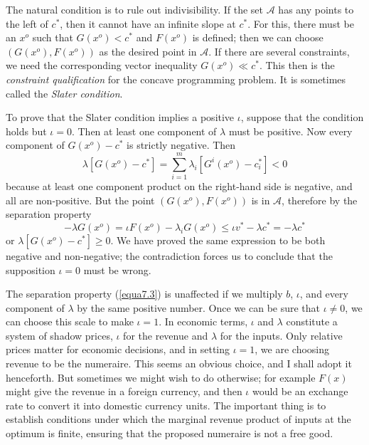 The natural condition is to rule out indivisibility. If the set $\mathcal{A}$ has any points to the left of $c^*$, then it cannot have an infinite slope at $c^*$. For this, there must be an $x^o$ such that $G(x^o) < c^*$ and $F(x^o)$ is defined; then we can choose $(G(x^o), F(x^o))$ as the desired point in $\mathcal{A}$. If there are several constraints, we need the corresponding vector inequality $G(x^o) \ll c^*$. This then is the \textit{constraint qualification} for the concave programming problem. It is sometimes called the \textit{Slater condition}.

To prove that the Slater condition implies a positive $\iota$, suppose that the condition holds but $\iota=0$. Then at least one component of $\lambda$ must be positive. Now every component of $G(x^o) - c^*$ is strictly negative. Then
\begin{equation*}
\lambda [G(x^o) - c^*] = \sum\limits_{i=1}^m \lambda_i [G^i(x^o) - c_i^*] < 0
\end{equation*}
because at least one component product on the right-hand side is negative, and all are non-positive. But the point $(G(x^o), F(x^o))$ is in $\mathcal{A}$, therefore by the separation property
\begin{equation*}
- \lambda G(x^o)  =  \iota F(x^o) - \lambda_i G(x^o) \leq \iota v^* - \lambda c^* =  - \lambda c^*
\end{equation*}
or $\lambda [G(x^o) - c^*] \geq 0$. We have proved the same expression to be both negative and non-negative; the contradiction forces us to conclude that the supposition $\iota=0$ must be wrong.

The separation property (\ref{equa7.3}) is unaffected if we multiply $b$, $\iota$, and every component of $\lambda$ by the same positive number. Once we can be sure that $\iota \neq 0$, we can choose this scale to make $\iota = 1$. In economic terms, $\iota$ and $\lambda$ constitute a system of shadow prices, $\iota$ for the revenue and $\lambda$ for the inputs. Only relative prices matter for economic decisions, and in setting $\iota =1$, we are choosing revenue to be the numeraire. This seems an obvious choice, and I shall adopt it henceforth. But sometimes we might wish to do otherwise; for example $F(x)$ might give the revenue in a foreign currency, and then $\iota$ would be an exchange rate to convert it into domestic currency units. The important thing is to establish conditions under which the marginal revenue product of inputs at the optimum is finite, ensuring that the proposed numeraire is not a free good.

